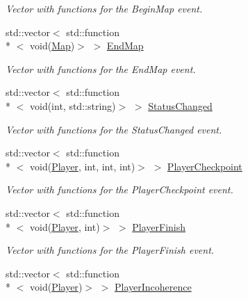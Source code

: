 \begin{DoxyCompactItemize}
\begin{DoxyCompactList}\small\item\em Vector with functions for the Begin\-Map event. \end{DoxyCompactList}\item 
\hypertarget{classPlugin_ad872750ef7512a9961bc7653a5d8056c}{std\-::vector$<$ std\-::function\\*
$<$ void(\hyperlink{structMap}{Map})$>$ $>$ \hyperlink{classPlugin_ad872750ef7512a9961bc7653a5d8056c}{End\-Map}}\label{classPlugin_ad872750ef7512a9961bc7653a5d8056c}

\begin{DoxyCompactList}\small\item\em Vector with functions for the End\-Map event. \end{DoxyCompactList}\item 
\hypertarget{classPlugin_a1d1a7c5ee8f037cc4277225994829902}{std\-::vector$<$ std\-::function\\*
$<$ void(int, std\-::string)$>$ $>$ \hyperlink{classPlugin_a1d1a7c5ee8f037cc4277225994829902}{Status\-Changed}}\label{classPlugin_a1d1a7c5ee8f037cc4277225994829902}

\begin{DoxyCompactList}\small\item\em Vector with functions for the Status\-Changed event. \end{DoxyCompactList}\item 
\hypertarget{classPlugin_abc2ce0103b7783a4ff4b3009cb18af7b}{std\-::vector$<$ std\-::function\\*
$<$ void(\hyperlink{structPlayer}{Player}, int, int, int)$>$ $>$ \hyperlink{classPlugin_abc2ce0103b7783a4ff4b3009cb18af7b}{Player\-Checkpoint}}\label{classPlugin_abc2ce0103b7783a4ff4b3009cb18af7b}

\begin{DoxyCompactList}\small\item\em Vector with functions for the Player\-Checkpoint event. \end{DoxyCompactList}\item 
\hypertarget{classPlugin_a16aadb48218d18235979314d259699aa}{std\-::vector$<$ std\-::function\\*
$<$ void(\hyperlink{structPlayer}{Player}, int)$>$ $>$ \hyperlink{classPlugin_a16aadb48218d18235979314d259699aa}{Player\-Finish}}\label{classPlugin_a16aadb48218d18235979314d259699aa}

\begin{DoxyCompactList}\small\item\em Vector with functions for the Player\-Finish event. \end{DoxyCompactList}\item 
\hypertarget{classPlugin_abcc9fff7f98ac9a872a965f0809b7f53}{std\-::vector$<$ std\-::function\\*
$<$ void(\hyperlink{structPlayer}{Player})$>$ $>$ \hyperlink{classPlugin_abcc9fff7f98ac9a872a965f0809b7f53}{Player\-Incoherence}}\label{classPlugin_abcc9fff7f98ac9a872a965f0809b7f53}


\end{DoxyCompactItemize}
